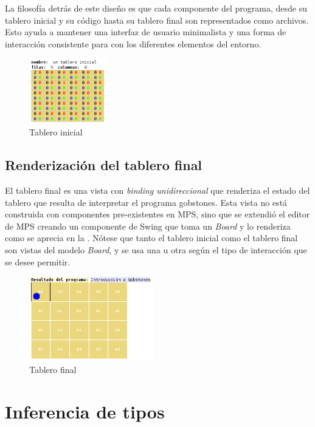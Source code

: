 La filosofía detrás de este diseño es que cada componente del programa, desde su tablero inicial y su código hasta su tablero final son representados como archivos. Esto ayuda a mantener una interfaz de usuario minimalista y una forma de interacción consistente para con los diferentes elementos del entorno.

\begin{figure}[hb]
\centering
\includegraphics[width=0.3\textwidth]{assets/initial_board}
\caption{Tablero inicial}
\label{fig:initial_board}
\end{figure}


\subsection{Renderización del tablero final}

El tablero final es una vista con \textit{binding unidireccional} que renderiza el estado del tablero que resulta de interpretar el programa gobstones. Esta vista no está construida con componentes pre-existentes en MPS, sino que se extendió el editor de MPS creando un componente de Swing\cite{swing} que toma un \textit{Board} y lo renderiza como se aprecia en la . Nótese que tanto el tablero inicial como el tablero final son vistas del modelo \textit{Board}, y se usa una u otra según el tipo de interacción que se desee permitir.

\begin{figure}[hb]
\centering
\includegraphics[width=0.48\textwidth]{assets/result_board}
\caption{Tablero final}
\label{fig:result_board}
\end{figure}


\section{Inferencia de tipos}

